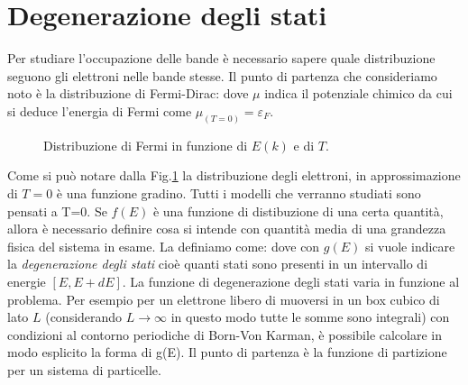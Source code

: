\section{Degenerazione degli stati}
Per studiare l'occupazione delle bande è necessario sapere quale distribuzione seguono gli elettroni nelle bande stesse. Il punto di partenza che consideriamo noto è la distribuzione di Fermi-Dirac:
dove $\mu$ indica il potenziale chimico da cui si deduce l'energia di Fermi come $\mu_{(T=0)}=\varepsilon_F$.
\begin{figure}
	\centering
	\caption{Distribuzione di Fermi in funzione di $E(k)$ e di $T$.}
	\label{Fermi}
\end{figure}
Come si può notare dalla Fig.\ref{Fermi} la distribuzione degli elettroni, in approssimazione di $T=0$ è una funzione gradino. Tutti i modelli che verranno studiati sono pensati a T=0. Se $f(E)$ è una funzione di distibuzione di una certa quantità, allora è necessario definire cosa si intende con quantità media di una grandezza fisica del sistema in esame. La definiamo come:
dove con $g(E)$ si vuole indicare la \textit{degenerazione degli stati} cioè quanti stati sono presenti in un intervallo di energie $[E,E+dE]$. La funzione di degenerazione degli stati varia in funzione al problema. Per esempio per un elettrone libero di muoversi in un box cubico di lato $L$ (considerando $L\to\infty$ in questo modo tutte le somme sono integrali) con condizioni al contorno periodiche di Born-Von Karman, è possibile calcolare in modo esplicito la forma di g(E). Il punto di partenza è la funzione di partizione per un sistema di particelle. 
